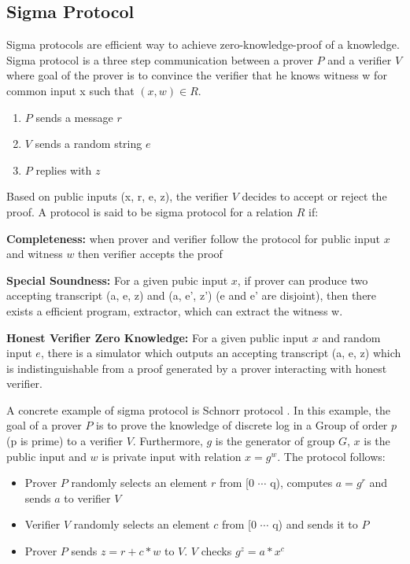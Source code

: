 \begin{enumerate}
{   
    \subsection{Sigma Protocol}
    \label{sec:sigma}
     Sigma protocols are efficient way to achieve zero-knowledge-proof of a knowledge.   Sigma protocol is 
     a three step communication between a prover $P$ and a verifier $V$ where goal of the prover is to convince the verifier that 
     he knows witness w for common input x such that  $(x, w) \in R$.   
     
     \begin{enumerate}
     \item $P$ sends a message $r$
     \item $V$ sends a random string $e$
     \item $P$ replies with $z$
     \end{enumerate}
     
     Based on public inputs (x, r, e, z), the verifier $V$ decides to accept or reject the proof.   A protocol is 
     said to be sigma protocol for a relation $R$ if: 
     
     \textbf{Completeness:} when prover and verifier follow the protocol for public input $x$ and witness $w$ 
          then verifier accepts the proof
          
      \textbf{Special Soundness:} For a given pubic input $x$, if prover can produce two accepting transcript (a, e, z) 
      and (a, e', z') (e and e' are disjoint), then there exists a efficient program, extractor, which can extract the 
      witness w.
      
      \textbf{Honest Verifier Zero Knowledge:} For a given public input $x$ and random input $e$, there is a simulator 
      which outputs an accepting transcript (a, e, z) which is indistinguishable from a proof generated by 
      a prover interacting with honest verifier. 
     
     A concrete example of sigma protocol is Schnorr protocol \citep{10.1007/3-540-48658-5_19}. In this example, 
     the goal of a prover $P$ is
     to prove the knowledge of discrete log in a Group of order $p$ (p is prime) to a verifier $V$.
     Furthermore, $g$ is the generator of 
     group $G$, $x$ is the public input and $w$ is private input with relation $x = g^w$. The protocol follows:
     
     \begin{itemize}
     \item Prover $P$ randomly selects an element $r$ from [0 $\dotsb$ q), computes $a = g^r$ and sends $a$ to verifier $V$
     \item Verifier $V$ randomly selects an element $c$ from [0 $\dotsb$ q) and sends it to $P$
     \item Prover $P$ sends $z = r + c * w $ to $V$.  $V$ checks $g^{z} = a * x^{c}$
     \end{itemize}
     
}
\end{enumerate}
